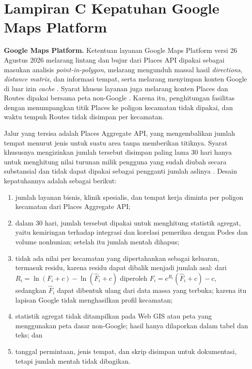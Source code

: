 \documentclass[12pt,a4paper,oneside,openany,indonesian]{report}
\begin{document}
\chapter{Lampiran C Kepatuhan Google Maps Platform}\label{lamp:google}

\textbf{Google Maps Platform.} Ketentuan layanan Google Maps Platform
versi 26 Agustus 2026 melarang lintang dan bujur dari Places API dipakai
sebagai masukan analisis \emph{point-in-polygon}, melarang mengunduh
massal hasil \emph{directions}, \emph{distance matrix}, dan informasi
tempat, serta melarang menyimpan konten Google di luar izin
\emph{cache} \parencite[§3.2.3]{googlemaps2026tos}. Syarat khusus layanan
juga melarang konten Places dan Routes dipakai bersama peta non-Google
\parencite[§14, §19]{googlemaps2026terms}. Karena itu, penghitungan
fasilitas dengan menumpangkan titik Places ke poligon kecamatan tidak
dipakai, dan waktu tempuh Routes tidak disimpan per kecamatan.

Jalur yang tersisa adalah Places Aggregate API, yang mengembalikan
jumlah tempat menurut jenis untuk suatu area tanpa memberikan titiknya.
Syarat khususnya mengizinkan jumlah tersebut disimpan paling lama 30 hari
hanya untuk menghitung nilai turunan milik pengguna yang sudah diubah
secara substansial dan tidak dapat dipakai sebagai pengganti jumlah
aslinya \parencite[§13]{googlemaps2026terms}. Desain kepatuhannya adalah
sebagai berikut:

\begin{enumerate}
\tightlist
\item
  jumlah layanan bisnis, klinik spesialis, dan tempat kerja diminta per
  poligon kecamatan dari Places Aggregate API;
\item
  dalam 30 hari, jumlah tersebut dipakai untuk menghitung statistik
  agregat, yaitu kemiringan terhadap integrasi dan korelasi pemeriksa
  dengan Podes dan volume nonhunian; setelah itu jumlah mentah dihapus;
\item
  tidak ada nilai per kecamatan yang dipertahankan sebagai keluaran,
  termasuk residu, karena
  residu dapat dibalik menjadi jumlah asal: dari $R_i=\ln(F_i+c)-\ln(\widehat F_i+c)$
  diperoleh $F_i=e^{R_i}(\widehat F_i+c)-c$, sedangkan $\widehat F_i$
  dapat dibentuk ulang dari data massa yang terbuka; karena itu lapisan
  Google tidak menghasilkan profil kecamatan;
\item
  statistik agregat tidak ditampilkan pada Web GIS atau peta yang
  menggunakan peta dasar non-Google; hasil hanya dilaporkan dalam tabel
  dan teks; dan
\item
  tanggal permintaan, jenis tempat, dan skrip disimpan untuk
  dokumentasi, tetapi jumlah mentah tidak dibagikan.
\end{enumerate}
\end{document}
